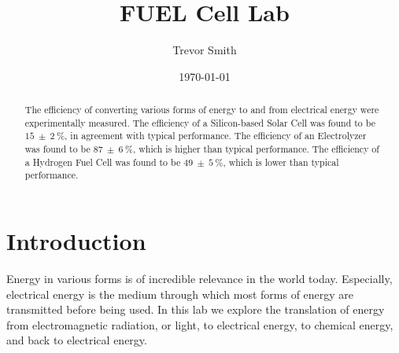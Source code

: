 \documentclass[aps,prl,reprint]{revtex4-2}
\begin{document}

\title{FUEL Cell Lab}


\author{Trevor Smith}


\date{\today}

\begin{abstract}
	The efficiency of converting various forms of energy to and from 
	electrical energy were experimentally measured. The efficiency of a
	Silicon-based Solar Cell was found to be $15\ \pm\ 2\ \%$, in agreement
	with typical performance. The efficiency of an Electrolyzer was found to
	be $87\ \pm\ 6\ \%$, which is higher than typical performance. The 
	efficiency of a Hydrogen Fuel Cell was found to be $49\ \pm\ 5\ \%$,
	which is lower than typical performance. 
\end{abstract}


\maketitle

\section{Introduction}

Energy in various forms is of incredible relevance in the world today. Especially, electrical energy is the medium through
which most forms of energy are transmitted before being used. In this lab we explore the translation of energy from 
electromagnetic radiation, or light, to electrical energy, to chemical energy, and back to electrical energy.
\end{document}
